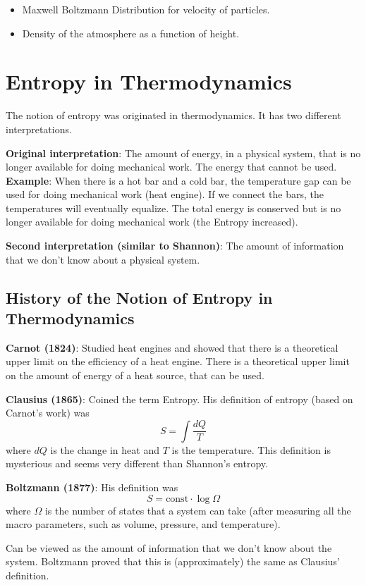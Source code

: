 \documentclass{article}
\begin{document}
\begin{itemize}
    \item Maxwell Boltzmann Distribution for velocity of particles.
    \item Density of the atmosphere as a function of height.
\end{itemize}

\section{Entropy in Thermodynamics}

The notion of entropy was originated in thermodynamics. It has two different interpretations. 

\textbf{Original interpretation}: The amount of energy, in a physical system, that is no longer available for doing mechanical work. The energy that cannot be used. \textbf{Example}: When there is a hot bar and a cold bar, the temperature gap can be used for doing mechanical work (heat engine). If we connect the bars, the temperatures will eventually equalize. The total energy is conserved but is no longer available for doing mechanical work (the Entropy increased).

\textbf{Second interpretation (similar to Shannon)}: The amount of information that we don't know about a physical system.

\subsection{History of the Notion of Entropy in Thermodynamics}

\textbf{Carnot (1824)}: Studied heat engines and showed that there is a theoretical upper limit on the efficiency of a heat engine. There is a theoretical upper limit on the amount of energy of a heat source, that can be used.

\textbf{Clausius (1865)}: Coined the term Entropy. His definition of entropy (based on Carnot's work) was 
\[
S=\int \frac{dQ}{T}
\]
where $dQ$ is the change in heat and $T$ is the temperature. This definition is mysterious and seems very different than Shannon's entropy.

\textbf{Boltzmann (1877)}: His definition was 
\[
S=\text{const}\cdot \log\Omega
\]
where $\Omega$ is the number of states that a system can take (after measuring all the macro parameters, such as volume, pressure, and temperature).

Can be viewed as the amount of information that we don't know about the system. Boltzmann proved that this is (approximately) the same as Clausius' definition.
\end{document}
